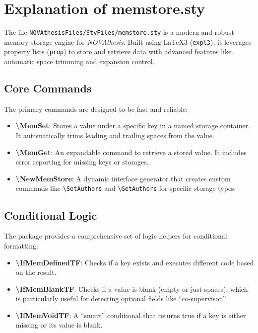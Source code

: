 

\chapter{Explanation of memstore.sty}
\label{annex:memstore}

The file \texttt{NOVAthesisFiles/StyFiles/memstore.sty} is a modern and robust memory storage engine for \emph{NOVAthesis}. Built using \LaTeX3 (\texttt{expl3}), it leverages property lists (\texttt{prop}) to store and retrieve data with advanced features like automatic space trimming and expansion control.

\section{Core Commands}
The primary commands are designed to be fast and reliable:
\begin{itemize}
    \item \textbf{\textbackslash MemSet}: Stores a value under a specific key in a named storage container. It automatically trims leading and trailing spaces from the value.
    \item \textbf{\textbackslash MemGet}: An expandable command to retrieve a stored value. It includes error reporting for missing keys or storages.
    \item \textbf{\textbackslash NewMemStore}: A dynamic interface generator that creates custom commands like \texttt{\textbackslash SetAuthors} and \texttt{\textbackslash GetAuthors} for specific storage types.
\end{itemize}

\section{Conditional Logic}
The package provides a comprehensive set of logic helpers for conditional formatting:
\begin{itemize}
    \item \textbf{\textbackslash IfMemDefinedTF}: Checks if a key exists and executes different code based on the result.
    \item \textbf{\textbackslash IfMemBlankTF}: Checks if a value is blank (empty or just spaces), which is particularly useful for detecting optional fields like ``co-supervisor.''
    \item \textbf{\textbackslash IfMemVoidTF}: A ``smart'' conditional that returns true if a key is either missing or its value is blank.
\end{itemize}

